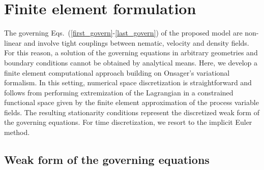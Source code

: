 \documentclass[12pt]{iopart}
\begin{document}
	
	\section{Finite element formulation} \label{sec_4}
	
	
	The governing Eqs.~(\ref{first_govern}-\ref{last_govern}) of the proposed model are non-linear and involve tight couplings between nematic, velocity and density fields. For this reason, a solution of the governing equations in arbitrary geometries and boundary conditions cannot be obtained by analytical means. Here, we develop a finite element computational approach building on Onsager's variational formalism. In this setting, numerical space discretization is straightforward and follows from performing extremization of the Lagrangian in a constrained functional space given by the finite element approximation of the process variable fields. The resulting stationarity conditions represent the discretized weak form of the governing equations. For time discretization, we resort to the implicit Euler method. 
	
	\subsection{Weak form of the governing equations}
	
\end{document}

